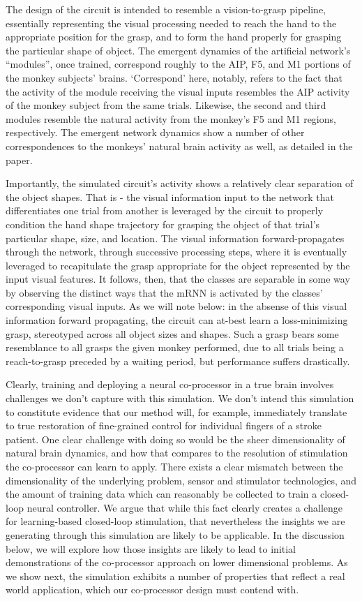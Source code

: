 \documentclass[12pt]{iopart}
\begin{document}
The design of the circuit is intended to resemble a vision-to-grasp pipeline, essentially
representing the visual processing needed to reach the hand to the appropriate position for
the grasp, and to form the hand properly for grasping the particular shape of object. The
emergent dynamics of the artificial network's ``modules'', once trained, correspond roughly
to the AIP, F5, and M1 portions of the monkey subjects' brains. `Correspond' here, notably,
refers to the fact that the activity of the module receiving the visual inputs resembles
the AIP activity of the monkey subject from the same trials. Likewise, the second and
third modules resemble the natural activity from the monkey's F5 and M1 regions, respectively.
The emergent network dynamics show a number of other correspondences to the monkeys' natural
brain activity as well, as detailed in the paper.

Importantly, the simulated circuit's activity shows a relatively clear separation of the
object shapes. That is - the visual information input to the network that differentiates
one trial from another is leveraged by the circuit to properly condition
the hand shape trajectory for grasping the object of that trial's particular shape, size, and
location. The visual information forward-propagates through the network, through successive
processing steps, where it is eventually leveraged to recapitulate the grasp appropriate
for the object represented by the input visual features. It follows, then, that the classes
are separable in some way by observing the distinct ways that the mRNN is activated by the
classes' corresponding visual inputs. As we will note below: in the absense of this
visual information forward propagating, the circuit can at-best learn a loss-minimizing grasp,
stereotyped across all object sizes and shapes. Such a grasp bears some resemblance to all
grasps the given monkey performed, due to all trials being a reach-to-grasp preceded by a
waiting period, but performance suffers drastically.

Clearly, training and deploying a neural co-processor in a true brain involves challenges we
don't capture with this simulation. We don't intend this simulation to constitute evidence
that our method will, for example, immediately translate to true restoration of fine-grained
control for individual fingers of a stroke patient. One clear challenge with doing so would be the
sheer dimensionality of natural brain dynamics, and how that compares to the resolution
of stimulation the co-processor can learn to apply. There exists a clear mismatch between
the dimensionality of the underlying problem, sensor and stimulator technologies, and the amount of training
data which can reasonably be collected to train a closed-loop neural controller. We argue
that while this fact clearly creates a challenge for learning-based closed-loop stimulation,
that nevertheless the insights we are generating through this simulation are likely to be
applicable. In the discussion below, we will explore how those insights are likely to lead
to initial demonstrations of the co-processor approach on lower dimensional problems.
As we show next, the simulation exhibits a number of properties that reflect
a real world application, which our co-processor design must contend with.
\end{document}
